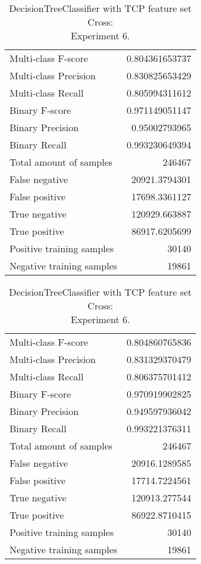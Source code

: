 \begin{table}[H]
\begin{minipage}{0.5\textwidth}
\caption{DecisionTreeClassifier with TCP feature set Cross: \\Experiment 5.}
\centering
\begin{tabular}{l r}
\toprule
Multi-class F-score & 0.804361653737 \\
Multi-class Precision & 0.830825653429 \\
Multi-class Recall & 0.805994311612 \\
\midrule
Binary F-score & 0.971149051147 \\
Binary Precision & 0.95002793965 \\
Binary Recall & 0.993230649394 \\
\midrule
Total amount of samples & 246467 \\
False negative & 20921.3794301 \\
False positive & 17698.3361127 \\
True negative & 120929.663887 \\
True positive & 86917.6205699 \\
\midrule
Positive training samples & 30140 \\
Negative training samples & 19861 \\
\bottomrule
\end{tabular}
\end{minipage}
\hfillx
\begin{minipage}{0.5\textwidth}
\caption{DecisionTreeClassifier with TCP feature set Cross: \\Experiment 6.}
\centering
\begin{tabular}{l r}
\toprule
Multi-class F-score & 0.804860765836 \\
Multi-class Precision & 0.831329370479 \\
Multi-class Recall & 0.806375701412 \\
\midrule
Binary F-score & 0.970919902825 \\
Binary Precision & 0.949597936042 \\
Binary Recall & 0.993221376311 \\
\midrule
Total amount of samples & 246467 \\
False negative & 20916.1289585 \\
False positive & 17714.7224561 \\
True negative & 120913.277544 \\
True positive & 86922.8710415 \\
\midrule
Positive training samples & 30140 \\
Negative training samples & 19861 \\
\bottomrule
\end{tabular}
\end{minipage}
\end{table}
